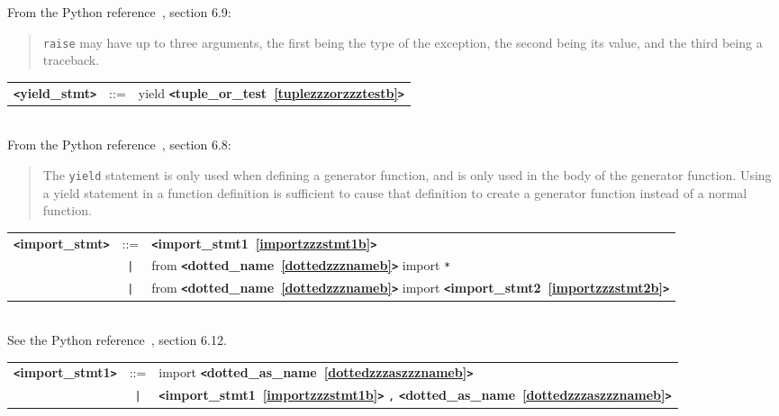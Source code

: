 From the Python reference~\cite{pythonlang}, section 6.9:
\begin{quote}
\verb|raise| may have up to three arguments, the first being the type of the exception,
the second being its value, and the third being a traceback.
\end{quote}

\label{yieldzzzstmtb}
\begin{tabular}{lcl}
{\bf \verb+<+yield\_stmt\verb+>+} & ::=  & yield {\bf \verb+<+tuple\_or\_test~\ref{tuplezzzorzzztestb}\verb+>+}  \\
\end{tabular} \\

From the Python reference~\cite{pythonlang}, section 6.8:
\begin{quote}
The \verb|yield| statement is only used when defining a generator function, 
and is only used in the body of the generator function. Using a yield 
statement in a function definition is sufficient to cause that definition 
to create a generator function instead of a normal function.
\end{quote}

\label{importzzzstmtb}
\begin{tabular}{lcl}
{\bf \verb+<+import\_stmt\verb+>+} & ::=  & {\bf \verb+<+import\_stmt1~\ref{importzzzstmt1b}\verb+>+}  \\
 & \verb+|+  & from {\bf \verb+<+dotted\_name~\ref{dottedzzznameb}\verb+>+}  import \verb|*| \\
 & \verb+|+  & from {\bf \verb+<+dotted\_name~\ref{dottedzzznameb}\verb+>+}  import {\bf \verb+<+import\_stmt2~\ref{importzzzstmt2b}\verb+>+}  \\
\end{tabular} \\

See the Python reference~\cite{pythonlang}, section 6.12.

\label{importzzzstmt1b}
\begin{tabular}{lcl}
{\bf \verb+<+import\_stmt1\verb+>+} & ::=  & import {\bf \verb+<+dotted\_as\_name~\ref{dottedzzzaszzznameb}\verb+>+}  \\
 & \verb+|+  & {\bf \verb+<+import\_stmt1~\ref{importzzzstmt1b}\verb+>+}  \verb|,| {\bf \verb+<+dotted\_as\_name~\ref{dottedzzzaszzznameb}\verb+>+}  \\
\end{tabular}

